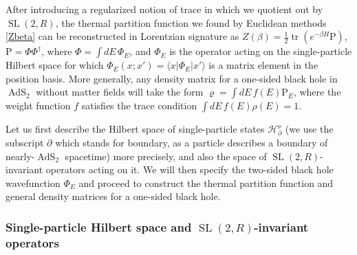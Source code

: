 \documentclass[12pt]{article}
\newcommand*{\bra}[1]{\langle{#1}|}
\newcommand*{\ket}[1]{|{#1}\rangle}
\newcommand{\calH}{\mathcal{H}}
\newcommand{\RR}{\mathbb{R}}
\DeclareMathOperator{\tr}{tr}
\DeclareMathOperator{\tSL}{\widetilde{\mathrm{SL}}}
\DeclareMathOperator{\tAdS}{\widetilde{AdS}}
\newcommand{\Rho}{\mathrm{P}}
\newcommand{\p}{\partial}
\def\widetilde#1{#1}%
\def\RR{R}
\begin{document}
After introducing a regularized notion of trace in which we quotient out by $\tSL(2,\RR)$, the thermal partition function we found by Euclidean methods \eqref{Zbeta} can be reconstructed in Lorentzian signature as $Z(\beta)=\frac{1}{2}\tr(e^{-\beta H} \Rho)$,\, $\Rho=\Phi \Phi^{\dagger}$, where $\Phi=\int dE\, \Phi_E$, and $\Phi_E$ is the operator acting on the single-particle Hilbert space for which $\Phi_E(x;x')=\bra{x}\Phi_E \ket{x'}$ is a matrix element in the position basis. More generally, any density matrix for a one-sided black hole in $\tAdS_2$ without matter fields will take the form $\varrho = \int dE\, f(E) \Rho_E$, where the weight function $f$ satisfies the trace condition $\int dE\, f(E) \rho(E)=1$.

Let us first describe the Hilbert space of single-particle states $\calH^{\nu}_{\p}$ (we use the subscript $\p$ which stands for boundary, as a particle describes a boundary of nearly-$\tAdS_2$ spacetime) more precisely, and also the space of $\tSL(2,\RR)$-invariant operators acting on it. We will then specify the two-sided black hole wavefunction $\Phi_E$ and proceed to construct the thermal partition function and general density matrices for  a one-sided black hole.


\subsubsection{Single-particle Hilbert space and $\tSL(2,\RR)$-invariant operators}
\end{document}
